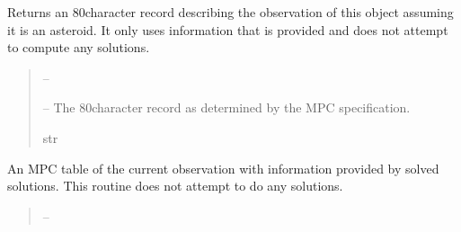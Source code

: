 \documentclass[letterpaper,11pt,english]{sphinxmanual}
\begin{document}
\begin{savenotes}
\begin{fulllineitems}
\begin{savenotes}
\begin{fulllineitems}
\end{fulllineitems}\end{savenotes}


\begin{savenotes}\begin{fulllineitems}
\label{\detokenize{code/opihiexarata.opihi.solution:opihiexarata.opihi.solution.OpihiSolution.mpc_record_row}}
\pysigstartsignatures
{}
\pysigstopsignatures
\sphinxAtStartPar
Returns an 80\sphinxhyphen{}character record describing the observation of this
object assuming it is an asteroid. It only uses information
that is provided and does not attempt to compute any solutions.
\begin{quote}\begin{description}
\sphinxAtStartPar
{} – 

\sphinxAtStartPar
{} – The 80\sphinxhyphen{}character record as determined by the MPC specification.

\sphinxAtStartPar
str

\end{description}\end{quote}

\end{fulllineitems}\end{savenotes}


\begin{savenotes}\begin{fulllineitems}
\label{\detokenize{code/opihiexarata.opihi.solution:opihiexarata.opihi.solution.OpihiSolution.mpc_table_row}}
\pysigstartsignatures
{}
\pysigstopsignatures
\sphinxAtStartPar
An MPC table of the current observation with information provided
by solved solutions. This routine does not attempt to do any solutions.
\begin{quote}\begin{description}
\sphinxAtStartPar
{} – 


\end{description}
\end{quote}
\end{fulllineitems}
\end{savenotes}
\end{fulllineitems}
\end{savenotes}
\end{document}
